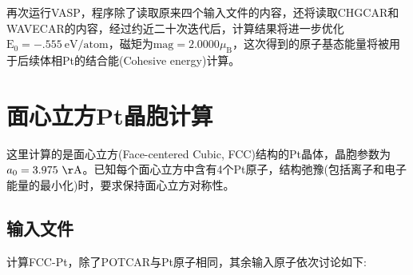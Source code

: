 {{再次运行\textrm{VASP}，程序除了读取原来四个输入文件的内容，还将读取\textrm{CHGCAR}和\textrm{WAVECAR}的内容，经过约近二十次迭代后，计算结果将进一步优化$\mathrm{E}_0=-.555\mathrm{~eV/atom}$，磁矩为$\mathrm{mag}=2.0000\mu_{\mathrm{B}}$，这次得到的原子基态能量将被用于后续体相\textrm{Pt}的结合能\textrm{(Cohesive energy)}计算。

\section{面心立方Pt晶胞计算}\label{Sec:FCC-Pt}
这里计算的是面心立方\textrm{(Face-centered Cubic, FCC)}结构的\textrm{Pt}晶体，晶胞参数为$a_0=3.975~\mathrm{\AA}$。已知每个面心立方中含有4个\textrm{Pt}原子，结构弛豫(包括离子和电子能量的最小化)时，要求保持面心立方对称性。
\subsection{输入文件}
计算\textrm{FCC-Pt}，除了\textrm{POTCAR}与\textrm{Pt}原子相同，其余输入原子依次讨论如下:~
}}
